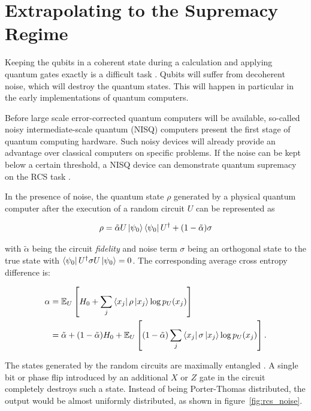 \section{Extrapolating to the Supremacy Regime}

Keeping the qubits in a coherent state during a calculation and applying quantum
gates exactly is a difficult task \cite{martines2019supremacy}. Qubits will suffer from decoherent noise, which will destroy the quantum states. This will happen in particular in the early implementations of quantum computers.

Before large scale error-corrected quantum computers will be available, so-called noisy intermediate-scale quantum (NISQ) computers present the first stage
of quantum computing hardware. Such noisy devices will already provide an
advantage over classical computers on specific problems. If the noise can be
kept below a certain threshold, a NISQ device can demonstrate quantum
supremacy on the RCS task \cite{neill2018blueprint}.

In the presence of noise, the quantum state $\rho$ generated by a physical quantum computer
after the execution of a random circuit $U$ can be represented as

\begin{equation}
  \rho = \tilde{\alpha} U \Ket{\psi_0} \Bra{\psi_0} U^{\dagger} + (1- \tilde{\alpha}) \sigma
\end{equation}

with $\tilde{\alpha}$ being the circuit \textit{fidelity} and noise term $\sigma$ being an orthogonal state to the true state with
$\Bra{\psi_0}U^{\dagger}\sigma U \Ket{\psi_0} = 0$.
The corresponding average cross entropy difference is:

\begin{align}
  \alpha &= \mathbb{E}_U\left[H_0+ \sum_j \Bra{x_j} \rho \Ket{x_j} \log{p_U(x_j)} \right] \\
         &= \tilde{\alpha} + (1-\tilde{\alpha})H_0 + \mathbb{E}_U\left[(1-\tilde{\alpha}) \sum_j \Bra{x_j} \sigma \Ket{x_j} \log{p_U(x_j)}\right].
\end{align}

The states generated by the random circuits are
maximally entangled \cite{Boixo2018supremacy}. A single bit or phase flip introduced by an additional $ X $ or $ Z $ gate in the circuit completely destroys such a state. Instead of being Porter-Thomas distributed, the output would be almost uniformly distributed, as shown in figure~\ref{fig:rcs_noise}.

